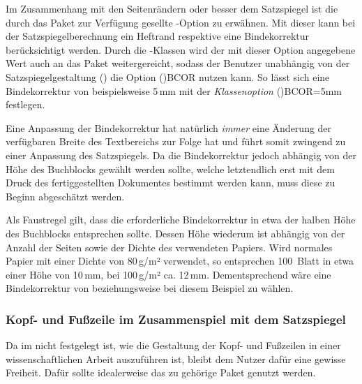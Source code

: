 \begin{DeclareEntity*}{}
\begin{DeclareEntity*}{}
\begin{DeclareEntity*}{}
Im Zusammenhang mit den Seitenrändern oder besser dem Satzspiegel ist die durch 
das Paket  zur Verfügung gesellte \KOMAScript-Option 
zu erwähnen. Mit dieser kann bei der Satzspiegelberechnung ein Heftrand respektive 
eine Bindekorrektur berücksichtigt werden. Durch die \TUDScript-Klassen wird 
der mit dieser Option angegebene Wert auch an das Paket  
weitergereicht, sodass der Benutzer unabhängig von der Satzspiegelgestaltung 
() die Option \Option(){BCOR} nutzen 
kann. So lässt sich eine Bindekorrektur von beispielsweise 5\,mm mit der 
\emph{Klassenoption} \Option*(){BCOR=5mm} festlegen.

Eine Anpassung der Bindekorrektur hat natürlich \emph{immer} eine Änderung der 
verfügbaren Breite des Textbereichs zur Folge hat und führt somit zwingend zu 
einer Anpassung des Satzspiegels. Da die Bindekorrektur jedoch abhängig von der 
Höhe des Buchblocks gewählt werden sollte, welche letztendlich erst mit dem 
Druck des fertiggestellten Dokumentes bestimmt werden kann, muss diese zu 
Beginn abgeschätzt werden.
%
\begin{Example}
Als Faustregel gilt, dass die erforderliche Bindekorrektur in etwa der halben 
Höhe des Buchblocks entsprechen sollte. Dessen Höhe wiederum ist abhängig von 
der Anzahl der Seiten sowie der Dichte des verwendeten Papiers. Wird normales 
Papier mit einer Dichte von 80\,g/m² verwendet, so entsprechen 100~Blatt in 
etwa einer Höhe von 10\,mm, bei 100\,g/m² ca. 12\,mm. Dementsprechend wäre eine 
Bindekorrektur von  beziehungsweise  bei 
diesem Beispiel zu wählen.%
\end{Example}



\subsubsection{%
  Kopf- und Fußzeile im Zusammenspiel mit dem Satzspiegel%
}

Da im \CD nicht festgelegt ist, wie die Gestaltung der Kopf- und Fußzeilen in 
einer wissenschaftlichen Arbeit auszuführen ist, bleibt dem Nutzer dafür eine 
gewisse Freiheit. Dafür sollte idealerweise das zu \KOMAScript gehörige Paket 
 genutzt werden. 


\end{DeclareEntity*}
\end{DeclareEntity*}
\end{DeclareEntity*}
